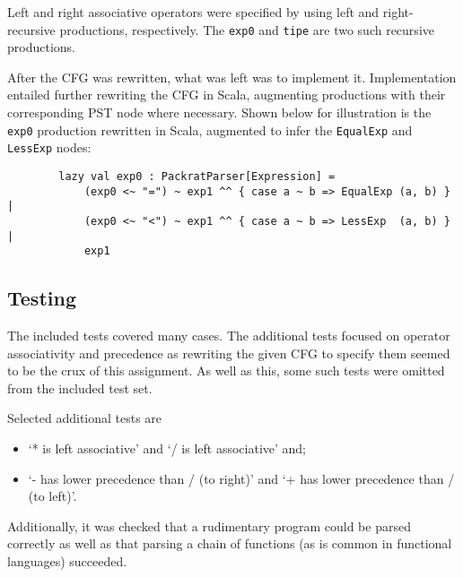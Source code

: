 \documentclass[a4paper]{article}
\begin{document}
	Left and right associative operators were specified by using left and right-recursive productions, respectively. The \verb|exp0| and \verb|tipe| are two such recursive productions.
	
	After the CFG was rewritten, what was left was to implement it. Implementation entailed further rewriting the CFG in Scala, augmenting productions with their corresponding PST node where necessary. Shown below for illustration is the \verb|exp0| production rewritten in Scala, augmented to infer the \verb|EqualExp| and \verb|LessExp| nodes:
	\begin{verbatim}
		lazy val exp0 : PackratParser[Expression] =
		    (exp0 <~ "=") ~ exp1 ^^ { case a ~ b => EqualExp (a, b) } | 
		    (exp0 <~ "<") ~ exp1 ^^ { case a ~ b => LessExp  (a, b) } |
		    exp1
	\end{verbatim}
	
	\subsection{Testing}
	The included tests covered many cases. The additional tests focused on operator associativity and precedence as rewriting the given CFG to specify them seemed to be the crux of this assignment. As well as this, some such tests were omitted from the included test set.
	
	Selected additional tests are
	\begin{itemize}
		\item `* is left associative' and `/ is left associative' and;
		\item `- has lower precedence than / (to right)' and `+ has lower precedence than / (to left)'.
	\end{itemize}
	Additionally, it was checked that a rudimentary program could be parsed correctly as well as that parsing a chain of functions (as is common in functional languages) succeeded.
\end{document}

